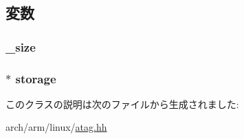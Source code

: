 \subsection{変数}
\hypertarget{classAtagHeader_a6648b5bbe7815b247a1ba6f03e1daac0}{
\subsubsection[{\_\-size}]{ {\bf \_\-size}}}
\label{classAtagHeader_a6648b5bbe7815b247a1ba6f03e1daac0}
\hypertarget{classAtagHeader_aec920815533132a07190032464816a9d}{
\subsubsection[{storage}]{$\ast$ {\bf storage}}}
\label{classAtagHeader_aec920815533132a07190032464816a9d}


このクラスの説明は次のファイルから生成されました:\begin{DoxyCompactItemize}
\item 
arch/arm/linux/\hyperlink{atag_8hh}{atag.hh}\end{DoxyCompactItemize}
